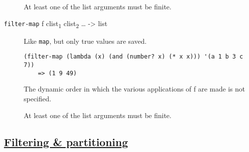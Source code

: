 \begin{description}
At least one of the list arguments must be finite.
\item[ \href{}{} \texttt{filter-map} f clist\textsubscript{1}
clist\textsubscript{2} \ldots{} -\textgreater{} list ]
Like \texttt{map}, but only true values are saved.

\begin{verbatim}
(filter-map (lambda (x) (and (number? x) (* x x))) '(a 1 b 3 c 7))
    => (1 9 49)
\end{verbatim}

The dynamic order in which the various applications of f are made is not
specified.

At least one of the list arguments must be finite.
\end{description}

\subsection{\texorpdfstring{\href{}{Filtering \&
partitioning}}{Filtering \& partitioning}}\label{filtering-partitioning}

